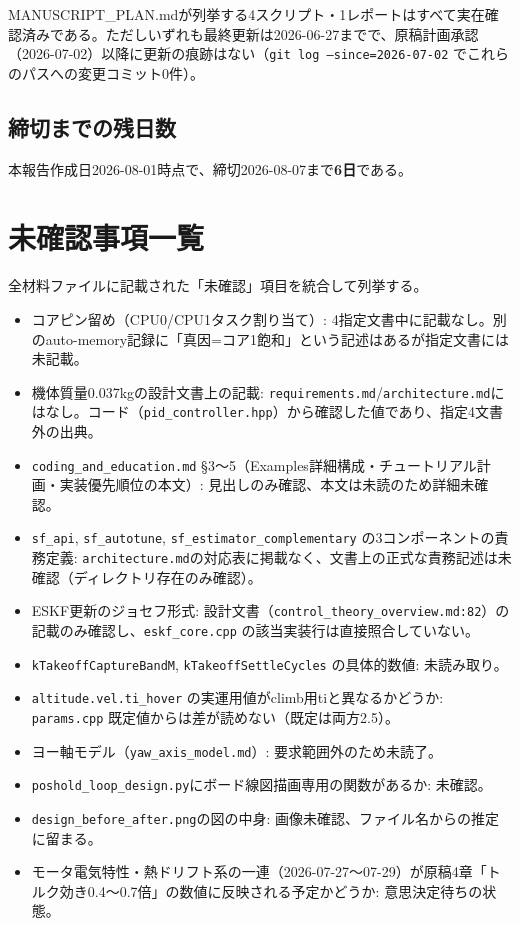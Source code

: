 \documentclass[a4paper,10pt]{ltjsarticle}
\begin{document}
MANUSCRIPT\_PLAN.mdが列挙する4スクリプト・1レポートはすべて実在確認済みである。ただしいずれも最終更新は2026-06-27までで、原稿計画承認（2026-07-02）以降に更新の痕跡はない（\texttt{git log --since=2026-07-02} でこれらのパスへの変更コミット0件）。

\subsection{締切までの残日数}

本報告作成日2026-08-01時点で、締切2026-08-07まで\textbf{6日}である。

\section{未確認事項一覧}

全材料ファイルに記載された「未確認」項目を統合して列挙する。

\begin{itemize}[leftmargin=*]
  \item コアピン留め（CPU0/CPU1タスク割り当て）: 4指定文書中に記載なし。別のauto-memory記録に「真因=コア1飽和」という記述はあるが指定文書には未記載。
  \item 機体質量0.037kgの設計文書上の記載: \texttt{requirements.md}/\texttt{architecture.md}にはなし。コード（\texttt{pid\_controller.hpp}）から確認した値であり、指定4文書外の出典。
  \item \texttt{coding\_and\_education.md} §3〜5（Examples詳細構成・チュートリアル計画・実装優先順位の本文）: 見出しのみ確認、本文は未読のため詳細未確認。
  \item \texttt{sf\_api}, \texttt{sf\_autotune}, \texttt{sf\_estimator\_complementary} の3コンポーネントの責務定義: \texttt{architecture.md}の対応表に掲載なく、文書上の正式な責務記述は未確認（ディレクトリ存在のみ確認）。
  \item ESKF更新のジョセフ形式: 設計文書（\texttt{control\_theory\_overview.md:82}）の記載のみ確認し、\texttt{eskf\_core.cpp} の該当実装行は直接照合していない。
  \item \texttt{kTakeoffCaptureBandM}, \texttt{kTakeoffSettleCycles} の具体的数値: 未読み取り。
  \item \texttt{altitude.vel.ti\_hover} の実運用値がclimb用tiと異なるかどうか: \texttt{params.cpp} 既定値からは差が読めない（既定は両方2.5）。
  \item ヨー軸モデル（\texttt{yaw\_axis\_model.md}）: 要求範囲外のため未読了。
  \item \texttt{poshold\_loop\_design.py}にボード線図描画専用の関数があるか: 未確認。
  \item \texttt{design\_before\_after.png}の図の中身: 画像未確認、ファイル名からの推定に留まる。
  \item モータ電気特性・熱ドリフト系の一連（2026-07-27〜07-29）が原稿4章「トルク効き0.4〜0.7倍」の数値に反映される予定かどうか: 意思決定待ちの状態。
\end{itemize}
\end{document}
